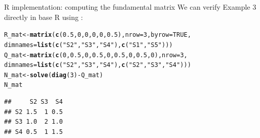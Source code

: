 \documentclass[aspectratio=169]{beamer}\usepackage[]{graphicx}\usepackage[]{xcolor}
\makeatletter
\newcommand{\hlnum}[1]{\textcolor[rgb]{0.686,0.059,0.569}{#1}}%
\newcommand{\hlsng}[1]{\textcolor[rgb]{0.192,0.494,0.8}{#1}}%
\newcommand{\hlopt}[1]{\textcolor[rgb]{0,0,0}{#1}}%
\newcommand{\hldef}[1]{\textcolor[rgb]{0.345,0.345,0.345}{#1}}%
\newcommand{\hlkwb}[1]{\textcolor[rgb]{0.69,0.353,0.396}{#1}}%
\newcommand{\hlkwc}[1]{\textcolor[rgb]{0.333,0.667,0.333}{#1}}%
\newcommand{\hlkwd}[1]{\textcolor[rgb]{0.737,0.353,0.396}{\textbf{#1}}}%
\newenvironment{kframe}{%
 \def\at@end@of@kframe{}%
 \ifinner\ifhmode%
  \def\at@end@of@kframe{\end{minipage}}%
  \begin{minipage}{\columnwidth}%
 \fi\fi%
 \def\FrameCommand##1{\hskip\@totalleftmargin \hskip-\fboxsep
 \colorbox{shadecolor}{##1}\hskip-\fboxsep
     \hskip-\linewidth \hskip-\@totalleftmargin \hskip\columnwidth}%
 \MakeFramed {\advance\hsize-\width
   \@totalleftmargin\z@ \linewidth\hsize
   \@setminipage}}%
 {\par\unskip\endMakeFramed%
 \at@end@of@kframe}
\newenvironment{knitrout}{}{} %
\providecommand{\bt}{\bm{t}}
\makeatother
\begin{document}
\begin{frame}[fragile]{R implementation: computing the fundamental matrix}
We can verify Example 3 directly in base R using :
\begin{knitrout}
\color{fgcolor}\begin{kframe}
\begin{alltt}
\hldef{R_mat} \hlkwb{<-} \hlkwd{matrix}\hldef{(}\hlkwd{c}\hldef{(}\hlnum{0.5}\hldef{,} \hlnum{0}\hldef{,}  \hlnum{0}\hldef{,} \hlnum{0}\hldef{,}  \hlnum{0}\hldef{,} \hlnum{0.5}\hldef{),} \hlkwc{nrow} \hldef{=} \hlnum{3}\hldef{,} \hlkwc{byrow} \hldef{=} \hlnum{TRUE}\hldef{,}
                \hlkwc{dimnames} \hldef{=} \hlkwd{list}\hldef{(}\hlkwd{c}\hldef{(}\hlsng{"S2"}\hldef{,} \hlsng{"S3"}\hldef{,} \hlsng{"S4"}\hldef{),} \hlkwd{c}\hldef{(}\hlsng{"S1"}\hldef{,} \hlsng{"S5"}\hldef{)))}
\hldef{Q_mat} \hlkwb{<-} \hlkwd{matrix}\hldef{(}\hlkwd{c}\hldef{(}\hlnum{0}\hldef{,} \hlnum{0.5}\hldef{,} \hlnum{0}\hldef{,}  \hlnum{0.5}\hldef{,} \hlnum{0}\hldef{,} \hlnum{0.5}\hldef{,}  \hlnum{0}\hldef{,} \hlnum{0.5}\hldef{,} \hlnum{0}\hldef{),} \hlkwc{nrow} \hldef{=} \hlnum{3}\hldef{,}
                \hlkwc{dimnames} \hldef{=} \hlkwd{list}\hldef{(}\hlkwd{c}\hldef{(}\hlsng{"S2"}\hldef{,} \hlsng{"S3"}\hldef{,} \hlsng{"S4"}\hldef{),} \hlkwd{c}\hldef{(}\hlsng{"S2"}\hldef{,} \hlsng{"S3"}\hldef{,} \hlsng{"S4"}\hldef{)))}
\hldef{N_mat} \hlkwb{<-} \hlkwd{solve}\hldef{(}\hlkwd{diag}\hldef{(}\hlnum{3}\hldef{)} \hlopt{-} \hldef{Q_mat)}
\hldef{N_mat}
\end{alltt}
\begin{verbatim}
##     S2 S3  S4
## S2 1.5  1 0.5
## S3 1.0  2 1.0
## S4 0.5  1 1.5
\end{verbatim}
\end{kframe}
\end{knitrout}
\end{frame}

\end{document}
